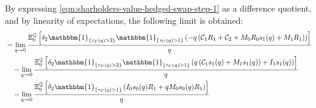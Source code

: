 \documentclass[main.tex]{subfiles}
\begin{document}
        By expressing \cref{eqn:sharholders-value-hedged-swap-step-1} as a difference quotient, and by linearity of expectations, the following limit is obtained:
        \begin{align}
            &=
            \lim_{q \rightarrow 0}
            \frac{
                \mathbb{E}_{0}^{\rnmeasure}\left[
                    \delta_2 \mathbbm{1}_{\{\tau_{F}(q)>2\}}
                    \mathbbm{1}_{\{\tau_{C}(q)>1\}}
                    \left(
                        - q\left(\mathcal{C}_1 R_1 + \mathcal{C}_2
                        + M_0 R_0 s_1(q)
                        + M_1 R_1\right)
                    \right)
                \right]
            }{
                q
            }
            \nonumber
            \\
            &\quad-
            \lim_{q \rightarrow 0}
            \frac{
                \mathbb{E}_{0}^{\rnmeasure}\left[
                    \delta_2 \mathbbm{1}_{\{\tau_{F}(q)>2\}}
                    \mathbbm{1}_{\{\tau_{C}(q)>1\}}
                    \left(
                        q\left(\mathcal{C}_{1} s_{1}(q)
                        + M_1 s_{1}(q)\right)
                        + I_1 s_{1}(q)
                    \right)
                \right]
            }{
                q
            }
            \nonumber
            \\
            &\quad-
            \lim_{q \rightarrow 0}
            \frac{
                \mathbb{E}_{0}^{\rnmeasure}\left[
                    \delta_2 \mathbbm{1}_{\{\tau_{F}(q)>1\}}
                    \left(
                        I_0 s_{0}(q) R_{1}
                        + qM_0 s_{0}(q) R_{1}
                    \right) 
                \right]
            }{
                q
            }
            \nonumber

\end{align}
\end{document}
